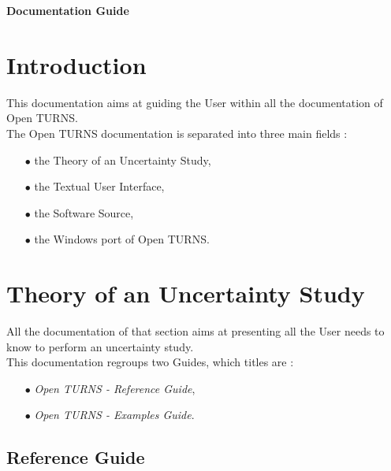 \documentclass[11pt]{article}
\begin{document}
\begin{titlepage}
  \vspace*{2cm}
  \begin{center}
    {\huge \bf Documentation Guide}
    
  \end{center}
\end{titlepage}
\newpage
\tableofcontents


\newpage

\section{Introduction}

This documentation aims at guiding the User within all the documentation of Open TURNS.\\

The Open TURNS documentation is separated into three main fields :
\begin{itemize}
\item[$\bullet$]  the Theory of an Uncertainty Study,
\item[$\bullet$]  the Textual User Interface,
\item[$\bullet$]  the Software Source,
\item[$\bullet$]  the Windows port of Open TURNS.
\end{itemize}

\section{Theory of an Uncertainty Study}

All the documentation of that section aims at presenting all the User needs to know to perform an uncertainty study.\\

This documentation regroups two Guides, which titles are :
\begin{itemize}
\item[$\bullet$] {\itshape Open TURNS - Reference Guide},
\item[$\bullet$] {\itshape Open TURNS - Examples Guide}.
\end{itemize}

\subsection{Reference Guide}
\end{document}
